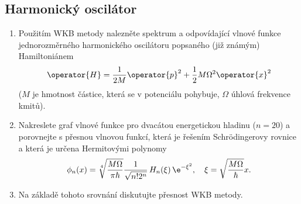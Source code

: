 \subsection{Harmonický oscilátor}
	\begin{enumerate}
		\item
			Použitím WKB metody nalezněte spektrum a odpovídající vlnové funkce jednorozměrného harmonického oscilátoru
			popsaného (již známým) Hamiltoniánem
			\begin{equation}
			\operator{H}
				=\frac{1}{2M}\operator{p}^{2}+\frac{1}{2}M\Omega^{2}\operator{x}^{2}
			\end{equation}
			($M$ je hmotnost částice, která se v potenciálu pohybuje, $\Omega$ úhlová frekvence kmitů).
		
		\item
			Nakreslete graf vlnové funkce pro dvacátou energetickou hladinu ($n=20$) a porovnejte s přesnou vlnovou funkcí, která je řešením Schrödingerovy rovnice a která je
			určena Hermitovými polynomy
			\begin{equation}
			\phi_{n}(x)
				=\sqrt[4]{\frac{M\Omega}{\pi\hbar}}\frac{1}{\sqrt{n!2^{n}}}\,
					H_{n}(\xi)\,\e^{-\xi^{2}},\quad\xi=\sqrt{\frac{M\Omega}{\hbar}}x.
			\end{equation}
		
		\item
			Na základě tohoto srovnání diskutujte přesnost WKB metody.
	\end{enumerate}

